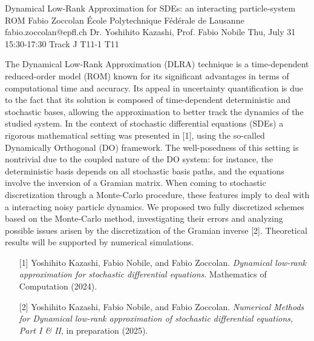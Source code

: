 \begin{talk}
  {Dynamical Low-Rank Approximation for SDEs: an interacting particle-system ROM}%
  {Fabio Zoccolan}%
  {École Polytechnique Fédérale de Lausanne}%
  {fabio.zoccolan@epfl.ch}%
  {Dr. Yoshihito Kazashi, Prof. Fabio Nobile}%
  {}%
  {Thu, July 31 15:30-17:30 Track J}%
  {T11-1}%
  {T11}%
  
The Dynamical Low-Rank Approximation (DLRA) technique is a time-dependent reduced-order model (ROM) known for its significant advantages in terms of computational time and accuracy. Its appeal in uncertainty quantification is due to the fact that its solution is composed of time-dependent deterministic and stochastic bases, allowing the approximation to better track the dynamics of the studied system. In the context of stochastic differential equations (SDEs) a rigorous mathematical setting was presented in [1], using the so-called Dynamically Orthogonal (DO) framework. The well-posedness of this setting is nontrivial due to the coupled nature of the DO system: for instance, the deterministic basis depends on all stochastic basis paths, and the equations involve the inversion of a Gramian matrix. When coming to stochastic discretization through a Monte-Carlo procedure, these features imply to deal with a interacting noisy particle dynamics. We proposed two fully discretized schemes based on the Monte-Carlo method, investigating their errors and analyzing possible issues arisen by the discretization of the Gramian inverse [2]. Theoretical results will be supported by numerical simulations.

\medskip
\begin{enumerate}
	\item[{[1]}] Yoshihito Kazashi, Fabio Nobile, and Fabio Zoccolan. {\it Dynamical low-rank approximation for stochastic differential equations}. Mathematics of Computation (2024).
	\item[{[2]}] Yoshihito Kazashi, Fabio Nobile, and Fabio Zoccolan. {\it Numerical Methods for Dynamical low-rank approximation of stochastic differential equations, Part I \& II}, in preparation (2025).
\end{enumerate}

\end{talk}

